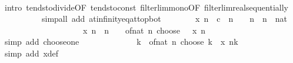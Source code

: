 \begin{isabellebody}
\ \ \ \ \ \ \ \ \isamarkupfalse%
\ {\isacharparenleft}{\kern0pt}intro\ tendsto{\isacharunderscore}{\kern0pt}divide{\isacharunderscore}{\kern0pt}{}{\isacharbrackleft}{\kern0pt}OF\ tendsto{\isacharunderscore}{\kern0pt}const{\isacharbrackright}{\kern0pt}\ filterlim{\isacharunderscore}{\kern0pt}mono{\isacharbrackleft}{\kern0pt}OF\ filterlim{\isacharunderscore}{\kern0pt}real{\isacharunderscore}{\kern0pt}sequentially{\isacharbrackright}{\kern0pt}{\isacharparenright}{\kern0pt}\isanewline
\ \ \ \ \ \ \ \ \ \ {\isacharparenleft}{\kern0pt}simp{\isacharunderscore}{\kern0pt}all\ add{\isacharcolon}{\kern0pt}\ at{\isacharunderscore}{\kern0pt}infinity{\isacharunderscore}{\kern0pt}eq{\isacharunderscore}{\kern0pt}at{\isacharunderscore}{\kern0pt}top{\isacharunderscore}{\kern0pt}bot{\isacharparenright}{\kern0pt}\isanewline
\ \ \ \ \ \ \isamarkupfalse%
\ {\isachardoublequoteopen}x\ n\ {\isasymle}\ c\ {\isacharslash}{\kern0pt}\ n{\isachardoublequoteclose}\ \ {\isachardoublequoteopen}{}\ {\isacharless}{\kern0pt}\ n{\isachardoublequoteclose}\ \ n\ {\isacharcolon}{\kern0pt}{\isacharcolon}{\kern0pt}\ nat\isanewline
\ \ \ \ \ \ \isamarkupfalse%
\ {\isacharminus}{\kern0pt}\isanewline
\ \ \ \ \ \ \ \ \isamarkupfalse%
\ {\isachardoublequoteopen}{}\ {\isacharplus}{\kern0pt}\ x\ n\ {\isacharasterisk}{\kern0pt}\ n\ {\isacharequal}{\kern0pt}\ {}\ {\isacharplus}{\kern0pt}\ of{\isacharunderscore}{\kern0pt}nat\ {\isacharparenleft}{\kern0pt}n\ choose\ {}{\isacharparenright}{\kern0pt}\ {\isacharasterisk}{\kern0pt}\ x\ n{\isacharcircum}{\kern0pt}{}{\isachardoublequoteclose}\isanewline
\ \ \ \ \ \ \ \ \ \ \isamarkupfalse%
\ {\isacharparenleft}{\kern0pt}simp\ add{\isacharcolon}{\kern0pt}\ choose{\isacharunderscore}{\kern0pt}one{\isacharparenright}{\kern0pt}\isanewline
\ \ \ \ \ \ \ \ \isamarkupfalse%
\ \isamarkupfalse%
\ {\isachardoublequoteopen}{\isasymdots}\ {\isasymle}\ {\isacharparenleft}{\kern0pt}{\isasymSum}k{\isasymin}{\isacharbraceleft}{\kern0pt}{}{\isacharcomma}{\kern0pt}\ {}{\isacharbraceright}{\kern0pt}{\isachardot}{\kern0pt}\ of{\isacharunderscore}{\kern0pt}nat\ {\isacharparenleft}{\kern0pt}n\ choose\ k{\isacharparenright}{\kern0pt}\ {\isacharasterisk}{\kern0pt}\ x\ n{\isacharcircum}{\kern0pt}k{\isacharparenright}{\kern0pt}{\isachardoublequoteclose}\isanewline
\ \ \ \ \ \ \ \ \ \ \isamarkupfalse%
\ {\isacharparenleft}{\kern0pt}simp\ add{\isacharcolon}{\kern0pt}\ x{\isacharunderscore}{\kern0pt}def{\isacharparenright}{\kern0pt}\isanewline

\end{isabellebody}
